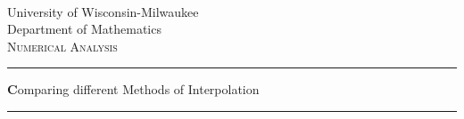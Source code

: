 
\newcommand{\institute}{University of Wisconsin-Milwaukee}
\newcommand{\instituteDepartment}{Department of Mathematics}
\newcommand{\workSpecification}{Numerical Analysis}
\newcommand{\workTitle}{Comparing different Methods of Interpolation}



\begin{titlepage}	
	\begin{center}
		
		~\\
		\vspace{1cm}
		\fontsize{18pt}{16}\selectfont
		\institute\\
		\Large \instituteDepartment\\
		\vspace*{5cm}
		\textsc{\Large \workSpecification} \bigskip
				
		\hrule \par\bigskip
		\textbf\workTitle

		\par\bigskip
		\hrule \par\bigskip
		\vspace{2cm}
		
		\large{}
	
	

			
		

		
	\end{center}
	
\end{titlepage}

